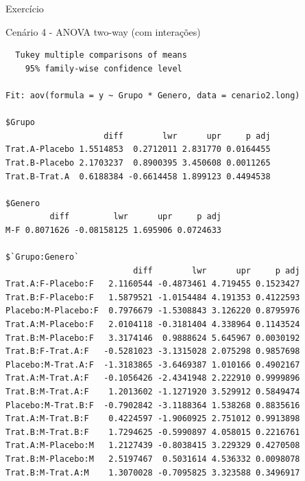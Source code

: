 \documentclass{beamer}
\begin{document}
\begin{frame}[fragile]{Exercício}
  \begin{exampleblock}{Cenário 4 - ANOVA two-way (com interações)}
    \tiny
\begin{verbatim}
  Tukey multiple comparisons of means
    95% family-wise confidence level

Fit: aov(formula = y ~ Grupo * Genero, data = cenario2.long)

$Grupo
                    diff        lwr      upr     p adj
Trat.A-Placebo 1.5514853  0.2712011 2.831770 0.0164455
Trat.B-Placebo 2.1703237  0.8900395 3.450608 0.0011265
Trat.B-Trat.A  0.6188384 -0.6614458 1.899123 0.4494538

$Genero
         diff         lwr      upr     p adj
M-F 0.8071626 -0.08158125 1.695906 0.0724633

$`Grupo:Genero`
                          diff        lwr      upr     p adj
Trat.A:F-Placebo:F   2.1160544 -0.4873461 4.719455 0.1523427
Trat.B:F-Placebo:F   1.5879521 -1.0154484 4.191353 0.4122593
Placebo:M-Placebo:F  0.7976679 -1.5308843 3.126220 0.8795976
Trat.A:M-Placebo:F   2.0104118 -0.3181404 4.338964 0.1143524
Trat.B:M-Placebo:F   3.3174146  0.9888624 5.645967 0.0030192
Trat.B:F-Trat.A:F   -0.5281023 -3.1315028 2.075298 0.9857698
Placebo:M-Trat.A:F  -1.3183865 -3.6469387 1.010166 0.4902167
Trat.A:M-Trat.A:F   -0.1056426 -2.4341948 2.222910 0.9999896
Trat.B:M-Trat.A:F    1.2013602 -1.1271920 3.529912 0.5849474
Placebo:M-Trat.B:F  -0.7902842 -3.1188364 1.538268 0.8835616
Trat.A:M-Trat.B:F    0.4224597 -1.9060925 2.751012 0.9913898
Trat.B:M-Trat.B:F    1.7294625 -0.5990897 4.058015 0.2216761
Trat.A:M-Placebo:M   1.2127439 -0.8038415 3.229329 0.4270508
Trat.B:M-Placebo:M   2.5197467  0.5031614 4.536332 0.0098078
Trat.B:M-Trat.A:M    1.3070028 -0.7095825 3.323588 0.3496917
\end{verbatim}
  \end{exampleblock}
\end{frame}



\end{document}
